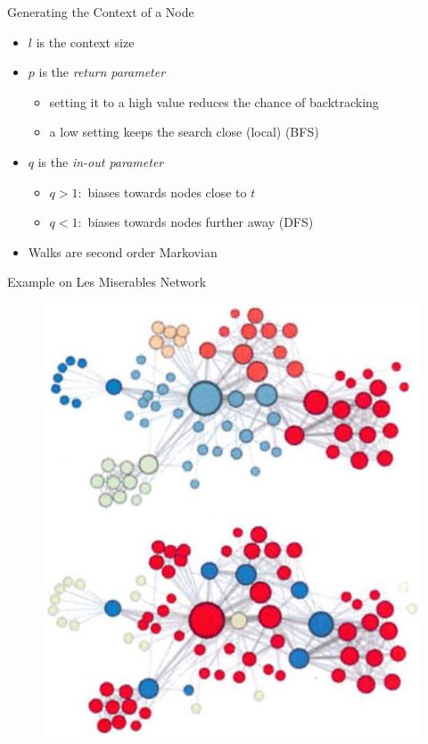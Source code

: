 \documentclass{beamer}
\begin{document}
\begin{frame}[allowframebreaks]{Generating the Context of a Node}
		\pagebreak
		
		\begin{itemize}
			\item $l$ is the context size
			\item $p$ is the \textit{return parameter}
			\begin{itemize}
				\item setting it to a high value reduces the chance of backtracking
				\item a low setting keeps the search close (local) (BFS)
			\end{itemize}
			\item $q$ is the \textit{in-out parameter}
			\begin{itemize}
				\item $q>1:$ biases towards nodes close to $t$
				\item $q<1:$ biases towards nodes further away (DFS)
			\end{itemize}
			\item Walks are second order Markovian
		\end{itemize}
		
		
	\end{frame}
	
	\begin{frame}{Example on Les Miserables Network}
		\begin{figure}
			\centering
			\includegraphics[scale=0.7]{presentation_5_figures/nihms825755f3}
		\end{figure}
	\end{frame}
	
\end{document}
